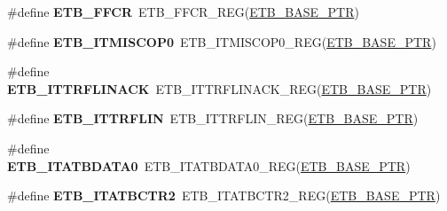 \begin{DoxyCompactItemize}
\item 
\hypertarget{group___e_t_b___register___accessor___macros_gad5f611c4c8085e792c8fbebf764d8049}{}\#define {\bfseries E\+T\+B\+\_\+\+F\+F\+C\+R}~E\+T\+B\+\_\+\+F\+F\+C\+R\+\_\+\+R\+E\+G(\hyperlink{group___e_t_b___peripheral_gaaefe9b614cb5542a69cb7461307f1267}{E\+T\+B\+\_\+\+B\+A\+S\+E\+\_\+\+P\+T\+R})\label{group___e_t_b___register___accessor___macros_gad5f611c4c8085e792c8fbebf764d8049}

\item 
\hypertarget{group___e_t_b___register___accessor___macros_ga5f523aea90b84c00084b481e6a7e675a}{}\#define {\bfseries E\+T\+B\+\_\+\+I\+T\+M\+I\+S\+C\+O\+P0}~E\+T\+B\+\_\+\+I\+T\+M\+I\+S\+C\+O\+P0\+\_\+\+R\+E\+G(\hyperlink{group___e_t_b___peripheral_gaaefe9b614cb5542a69cb7461307f1267}{E\+T\+B\+\_\+\+B\+A\+S\+E\+\_\+\+P\+T\+R})\label{group___e_t_b___register___accessor___macros_ga5f523aea90b84c00084b481e6a7e675a}

\item 
\hypertarget{group___e_t_b___register___accessor___macros_ga837ba08d8e56577618bbdb9239a0b958}{}\#define {\bfseries E\+T\+B\+\_\+\+I\+T\+T\+R\+F\+L\+I\+N\+A\+C\+K}~E\+T\+B\+\_\+\+I\+T\+T\+R\+F\+L\+I\+N\+A\+C\+K\+\_\+\+R\+E\+G(\hyperlink{group___e_t_b___peripheral_gaaefe9b614cb5542a69cb7461307f1267}{E\+T\+B\+\_\+\+B\+A\+S\+E\+\_\+\+P\+T\+R})\label{group___e_t_b___register___accessor___macros_ga837ba08d8e56577618bbdb9239a0b958}

\item 
\hypertarget{group___e_t_b___register___accessor___macros_gaef65430d59c0096ece515a58d2ca0284}{}\#define {\bfseries E\+T\+B\+\_\+\+I\+T\+T\+R\+F\+L\+I\+N}~E\+T\+B\+\_\+\+I\+T\+T\+R\+F\+L\+I\+N\+\_\+\+R\+E\+G(\hyperlink{group___e_t_b___peripheral_gaaefe9b614cb5542a69cb7461307f1267}{E\+T\+B\+\_\+\+B\+A\+S\+E\+\_\+\+P\+T\+R})\label{group___e_t_b___register___accessor___macros_gaef65430d59c0096ece515a58d2ca0284}

\item 
\hypertarget{group___e_t_b___register___accessor___macros_ga8a3932106db5401cd26d76cf8b481b8c}{}\#define {\bfseries E\+T\+B\+\_\+\+I\+T\+A\+T\+B\+D\+A\+T\+A0}~E\+T\+B\+\_\+\+I\+T\+A\+T\+B\+D\+A\+T\+A0\+\_\+\+R\+E\+G(\hyperlink{group___e_t_b___peripheral_gaaefe9b614cb5542a69cb7461307f1267}{E\+T\+B\+\_\+\+B\+A\+S\+E\+\_\+\+P\+T\+R})\label{group___e_t_b___register___accessor___macros_ga8a3932106db5401cd26d76cf8b481b8c}

\item 
\hypertarget{group___e_t_b___register___accessor___macros_gaebddbedad397a66dc974a2680fc9b1b7}{}\#define {\bfseries E\+T\+B\+\_\+\+I\+T\+A\+T\+B\+C\+T\+R2}~E\+T\+B\+\_\+\+I\+T\+A\+T\+B\+C\+T\+R2\+\_\+\+R\+E\+G(\hyperlink{group___e_t_b___peripheral_gaaefe9b614cb5542a69cb7461307f1267}{E\+T\+B\+\_\+\+B\+A\+S\+E\+\_\+\+P\+T\+R})\label{group___e_t_b___register___accessor___macros_gaebddbedad397a66dc974a2680fc9b1b7}


\end{DoxyCompactItemize}
